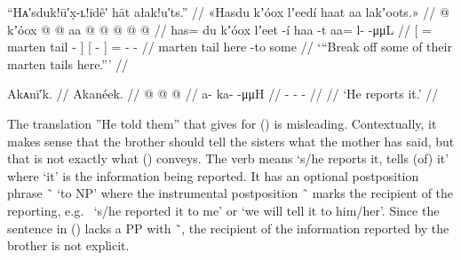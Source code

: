 \ex\label{ex:92-185-break-off-marten-tail}%
%
\begingl
	\glpreamble	“Hᴀ′sduk!ū′x̣-ʟ!īdê′ hāt ałak!u′ts.” //
	\glpreamble	«\!Hasdu kʼóox lʼeedí haat aa lakʼoots.\!» //
	\gla	{}  @ {} kʼóox  @ {} {}
		{}  @ {} {} aa @  @ {} @ {} @ {} @ {} //
	\glb	{} has= du kʼóox lʼeet -í {}
		{} haa -t {} aa= {} {} l-  -μμL //
	\glc	{}[ =  marten tail - {}]
		{}[  - {}]
		= \· \· -  - //
	\gld	{}  {} marten tail {} {}
		{} here -to {} some  {} {} {} {} //
	\glft	‘“Break off some of their marten tails here.”’
		//
\endgl
\xe

\ex\label{ex:92-186-he-tells}%
%
\begingl
	\glpreamble	Akᴀnī′k. //
	\glpreamble	Akanéek. //
	\gla	{} @ {} @ {} @ {} //
	\glb	a- ka-  -μμH //
	\glc	{}- -  - //
	\gld	{} {} {} {} //
	\glft	‘He reports it.’
		//
\endgl
\xe

The translation ”He told them” that \citeauthor{swanton:1909} gives for (\lastx) is misleading.
Contextually, it makes sense that the brother should tell the sisters what the mother has said, but that is not exactly what (\lastx) conveys.
The verb  means ‘s/he reports it, tells (of) it’ where ‘it’ is the information being reported.
It has an optional postposition phrase  \~\  ‘to NP’ where the instrumental postposition  \~\  marks the recipient of the reporting, e.g.\  ‘s/he reported it to me’ or  ‘we will tell it to him/her’.
Since the sentence in (\lastx) lacks a PP with  \~\ , the recipient of the information reported by the brother is not explicit.

